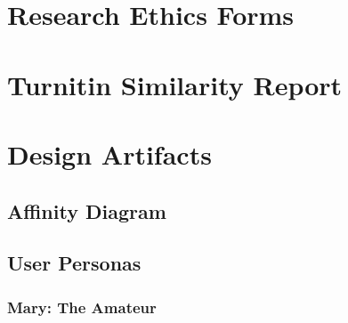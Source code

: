 %
%
%                 

\chapter{Research Ethics Forms}
\label{sec:appendixa}

\chapter{Turnitin Similarity Report}
\label{sec:appendixb}


\chapter{Design Artifacts}
\label{sec:appendixd}

\section{Affinity Diagram}

\newpage
\section{User Personas}
\label{sec:user-personas}

\begin{comment}
\begin{wrapfigure}{l}{0.5\textwidth}

  \begin{center}
    \texttt{[image: mary\_persona]}
  \end{center}
\end{wrapfigure}
\end{comment}

\subsection{Mary: The Amateur}

